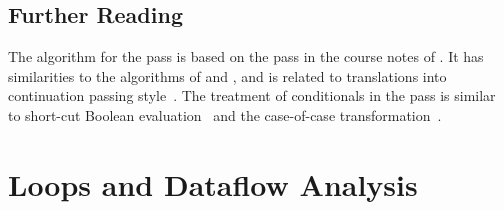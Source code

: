 \documentclass[7x10]{TimesAPriori_MIT}%
\numberwithin{theorem}{chapter}
\numberwithin{definition}{chapter}
\numberwithin{equation}{chapter}
\begin{document}
\section{Further Reading}
\label{sec:cond-further-reading}

The algorithm for the  pass is based on the
 pass in the course notes of
\citet{Dybvig:2010aa}.
%
It has similarities to the algorithms of \citet{Danvy:2003fk} and
\citet{Appel:2003fk}, and is related to translations into continuation
passing
style~\citep{Wijngaarden:1966,Fischer:1972,reynolds72:_def_interp,Plotkin:1975,Friedman:2001}.
%
The treatment of conditionals in the  pass is
similar to short-cut Boolean
evaluation~\citep{Logothetis:1981,Aho:2006wb,Clarke:1989,Danvy:2003fk}
and the case-of-case transformation~\citep{PeytonJones:1998}.

\chapter{Loops and Dataflow Analysis}
\label{ch:Lwhile}
\setcounter{footnote}{0}


\end{document}
